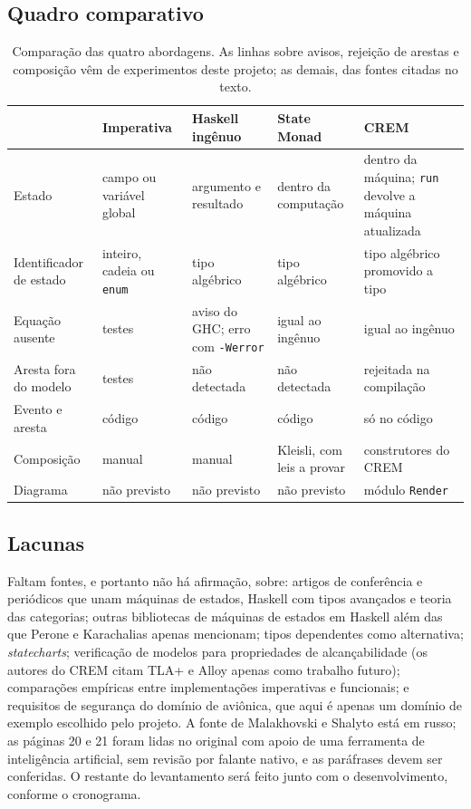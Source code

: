 \documentclass[12pt,a4paper]{article}
\begin{document}
\subsection{Quadro comparativo}

\begin{table}[h]
\centering
\footnotesize
\begin{tabular}{|p{2.5cm}|p{2.7cm}|p{2.7cm}|p{2.7cm}|p{3.0cm}|}
\hline
 & Imperativa & Haskell ingênuo & State Monad & CREM \\
\hline
Estado & campo ou variável global & argumento e resultado & dentro da computação & dentro da máquina; \texttt{run} devolve a máquina atualizada \\
\hline
Identificador de estado & inteiro, cadeia ou \texttt{enum} & tipo algébrico & tipo algébrico & tipo algébrico promovido a tipo \\
\hline
Equação ausente & testes & aviso do GHC; erro com \texttt{-Werror} & igual ao ingênuo & igual ao ingênuo \\
\hline
Aresta fora do modelo & testes & não detectada & não detectada & rejeitada na compilação \\
\hline
Evento e aresta & código & código & código & só no código \\
\hline
Composição & manual & manual & Kleisli, com leis a provar & construtores do CREM \\
\hline
Diagrama & não previsto & não previsto & não previsto & módulo \texttt{Render} \\
\hline
\end{tabular}
\caption{Comparação das quatro abordagens. As linhas sobre avisos, rejeição de arestas e composição vêm de experimentos deste projeto; as demais, das fontes citadas no texto.}
\end{table}

\subsection{Lacunas}

Faltam fontes, e portanto não há afirmação, sobre: artigos de conferência e periódicos que unam máquinas de estados, Haskell com tipos avançados e teoria das categorias; outras bibliotecas de máquinas de estados em Haskell além das que Perone e Karachalias apenas mencionam; tipos dependentes como alternativa; \textit{statecharts}; verificação de modelos para propriedades de alcançabilidade (os autores do CREM citam TLA+ e Alloy apenas como trabalho futuro); comparações empíricas entre implementações imperativas e funcionais; e requisitos de segurança do domínio de aviônica, que aqui é apenas um domínio de exemplo escolhido pelo projeto. A fonte de Malakhovski e Shalyto está em russo; as páginas 20 e 21 foram lidas no original com apoio de uma ferramenta de inteligência artificial, sem revisão por falante nativo, e as paráfrases devem ser conferidas. O restante do levantamento será feito junto com o desenvolvimento, conforme o cronograma.
\end{document}
